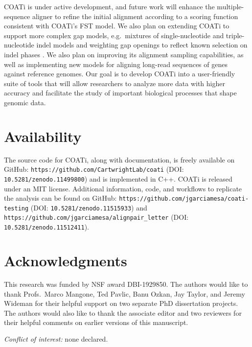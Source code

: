 \documentclass[12pt,letterpaper]{article}
\begin{document}
COATi is under active development, and future work will enhance the multiple-sequence aligner to refine the initial alignment according to a scoring function consistent with COATi's FST model. We also plan on extending COATi to support more complex gap models, e.g.\ mixtures of single-nucleotide and triple-nucleotide indel models and weighting gap openings to reflect known selection on indel phases \citep{zhu2022profiling}. We also plan on improving its alignment sampling capabilities, as well as implementing new models for aligning long-read sequences of genes against reference genomes. Our goal is to develop COATi into a user-friendly suite of tools that will allow researchers to analyze more data with higher accuracy and facilitate the study of important biological processes that shape genomic data.

\section*{Availability}

The source code for COATi, along with documentation, is freely available on GitHub: \nolinkurl{https://github.com/CartwrightLab/coati} (DOI: \nolinkurl{10.5281/zenodo.11499800}) and is implemented in C++. COATi is released under an MIT license. Additional information, code, and workflows to replicate the analysis can be found on GitHub: \nolinkurl{https://github.com/jgarciamesa/coati-testing} (DOI: \nolinkurl{10.5281/zenodo.11515933}) and \nolinkurl{https://github.com/jgarciamesa/alignpair_letter} (DOI: \nolinkurl{10.5281/zenodo.11512411}).


\section*{Acknowledgments}

This research was funded by NSF award DBI-1929850.
%
The authors would like to thank Profs.\ Marco Mangone, Ted Pavlic, Banu Ozkan, Jay Taylor, and Jeremy Wideman for their helpful support on two separate PhD dissertation projects. The authors would also like to thank the associate editor and two reviewers for their helpful comments on earlier versions of this manuscript.

\noindent \textit{Conflict of interest:} none declared.

%
\setlength{\bibhang}{0pt}


\nolinenumbers
\end{document}

